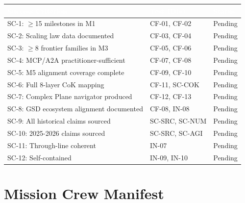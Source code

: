 \documentclass[11pt,letterpaper]{article}
\newcommand{\tableheader}[1]{\textbf{\sffamily\textcolor{white}{#1}}}
\begin{document}
\begin{center}
\begin{tabularx}{\textwidth}{XL{4cm}C{1.5cm}}
\toprule
{}
\tableheader{Success Criterion} & \tableheader{Test ID(s)} & \tableheader{Status} \\
\midrule
SC-1: $\geq$15 milestones in M1 & CF-01, CF-02 & Pending \\
SC-2: Scaling law data documented & CF-03, CF-04 & Pending \\
SC-3: $\geq$8 frontier families in M3 & CF-05, CF-06 & Pending \\
SC-4: MCP/A2A practitioner-sufficient & CF-07, CF-08 & Pending \\
SC-5: M5 alignment coverage complete & CF-09, CF-10 & Pending \\
SC-6: Full 8-layer CoK mapping & CF-11, SC-COK & Pending \\
SC-7: Complex Plane navigator produced & CF-12, CF-13 & Pending \\
SC-8: GSD ecosystem alignment documented & CF-08, IN-08 & Pending \\
SC-9: All historical claims sourced & SC-SRC, SC-NUM & Pending \\
SC-10: 2025-2026 claims sourced & SC-SRC, SC-AGI & Pending \\
SC-11: Through-line coherent & IN-07 & Pending \\
SC-12: Self-contained & IN-09, IN-10 & Pending \\
\bottomrule
\end{tabularx}
\end{center}

\section{Mission Crew Manifest}
\end{document}

